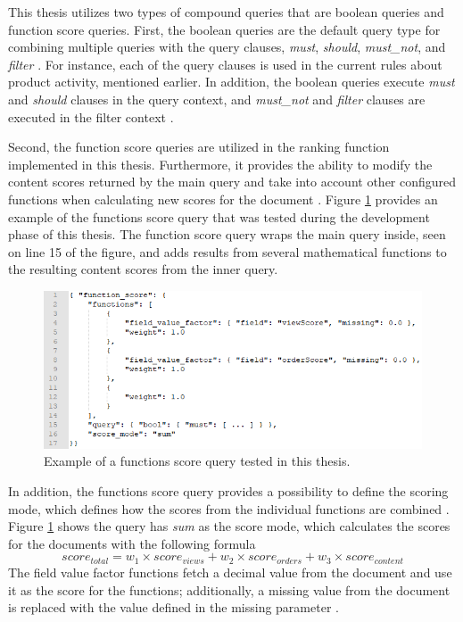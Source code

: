 This thesis utilizes two types of compound queries that are boolean queries and function score queries.
First, the boolean queries are the default query type for combining multiple queries with the query clauses, 
\emph{must}, \emph{should}, \emph{must\_not}, and \emph{filter} \cite{elasticIntro}.
For instance, each of the query clauses is used in the current rules about product activity, mentioned
earlier.
In addition, the boolean queries execute \emph{must} and \emph{should} clauses in the query context, 
and \emph{must\_not} and \emph{filter} clauses are executed in the filter context \cite{elasticIntro}.


Second, the function score queries are utilized in the ranking function implemented in this thesis.
Furthermore, it provides the ability to modify the content scores returned by the main query and
take into account other configured functions when calculating new scores for the document \cite{elasticIntro}.
Figure \ref{fig:function_score} provides an example of the functions score query that was tested 
during the development phase of this thesis.
The function score query wraps the main query inside, seen on line 15 of the figure, 
and adds results from several mathematical functions to the resulting content scores from the inner query.


\begin{figure}
    \centering
    \includegraphics[width=\textwidth]{img/function_score.png}
    \caption{Example of a functions score query tested in this thesis.}
    \label{fig:function_score}
\end{figure}


In addition, the functions score query provides a possibility to define the scoring mode, which defines
how the scores from the individual functions are combined \cite{relevantSearch}.
Figure \ref{fig:function_score} shows the query has \emph{sum} as the score mode, which calculates
the scores for the documents with the following formula \cite{relevantSearch}
\[ score_{total} = w_1 \times score_{views} + w_2 \times score_{orders} + w_3 \times score_{content} \]
The field value factor functions fetch a decimal value from the document and use it as the score
for the functions; additionally, a missing value from the document is replaced
with the value defined in the missing parameter \cite{elasticIntro}.


